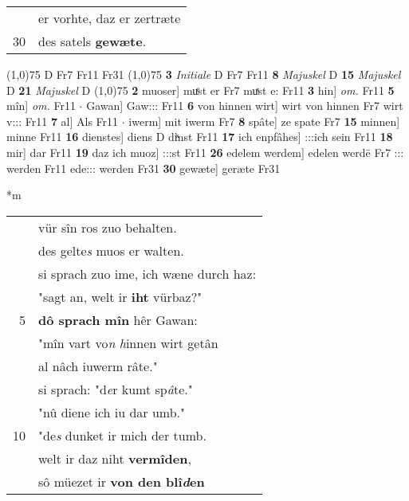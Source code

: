 \documentclass[8pt,a4paper,notitlepage]{article}
\begin{document}
\begin{table}[ht]
\begin{minipage}[t]{0.5\linewidth}
\begin{tabular}{rl}
 & er vorhte, daz er zertræte\\ 
30 & des satels \textbf{gewæte}.\\ 
\end{tabular}
\scriptsize
\line(1,0){75} \newline
D Fr7 Fr11 Fr31 \newline
\line(1,0){75} \newline
\textbf{3} \textit{Initiale} D Fr7 Fr11  \textbf{8} \textit{Majuskel} D  \textbf{15} \textit{Majuskel} D  \textbf{21} \textit{Majuskel} D  \newline
\line(1,0){75} \newline
\textbf{2} muoser] muͤst er Fr7 muͯst e: Fr11 \textbf{3} hin] \textit{om.} Fr11 \textbf{5} mîn] \textit{om.} Fr11  $\cdot$ Gawan] Gaw::: Fr11 \textbf{6} von hinnen wirt] wirt von hinnen Fr7 wirt v::: Fr11 \textbf{7} al] Als Fr11  $\cdot$ iwerm] mit iwerm Fr7 \textbf{8} spâte] ze spate Fr7 \textbf{15} minnen] minne Fr11 \textbf{16} dienstes] diens D diͯnst Fr11 \textbf{17} ich enpfâhes] :::ich sein Fr11 \textbf{18} mir] dar Fr11 \textbf{19} daz ich muoz] :::st Fr11 \textbf{26} edelem werdem] edelen werdē Fr7 ::: werden Fr11 ede::: werden Fr31 \textbf{30} gewæte] geræte Fr31 \newline
\end{minipage}
\hspace{0.5cm}
\begin{minipage}[t]{0.5\linewidth}
\small
\begin{center}*m
\end{center}
\begin{tabular}{rl}
 & vür sîn ros zuo behalten.\\ 
 & des gelte\textit{s} muos er walten.\\ 
 & si sprach zuo ime, ich wæne durch haz:\\ 
 & "sagt an, welt ir \textbf{iht} vürbaz?"\\ 
5 & \textbf{dô sprach mîn} hêr Gawan:\\ 
 & "mîn vart vo\textit{n} \textit{h}innen wirt getân\\ 
 & al nâch iuwerm râte."\\ 
 & si sprach: "d\textit{e}r kumt sp\textit{â}te."\\ 
 & "nû diene ich iu dar umb."\\ 
10 & "de\textit{s} dunket ir mich der tumb.\\ 
 & welt ir daz niht \textbf{vermîden},\\ 
 & sô müezet ir \textbf{von den blî\textit{d}en}\\ 

\end{tabular}
\end{minipage}
\end{table}
\end{document}
